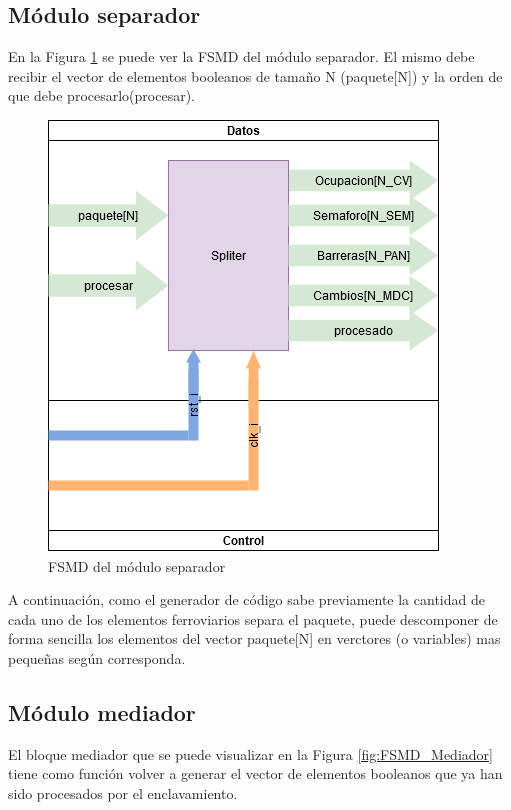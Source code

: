 	\subsection{Módulo separador}
	
		En la Figura \ref{fig:FSMD_Separador} se puede ver la FSMD del módulo separador. El mismo debe recibir el vector de elementos booleanos de tamaño N (paquete[N]) y la orden de que debe procesarlo(procesar). 
		\begin{figure}[h]
		\centering
			\includegraphics[scale=.5]{./Figures/FSMD-Separador}
			\caption{FSMD del módulo separador}
			\label{fig:FSMD_Separador}
		\end{figure}
		
		A continuación, como el generador de código sabe previamente la cantidad de cada uno de los elementos ferroviarios separa el paquete, puede descomponer de forma sencilla los elementos del vector paquete[N] en verctores (o variables) mas pequeñas según corresponda.
		
	\subsection{Módulo mediador}
	
		El bloque mediador que se puede visualizar en la Figura \ref{fig:FSMD_Mediador} tiene como función volver a generar el vector de elementos booleanos que ya han sido procesados por el enclavamiento.
		
